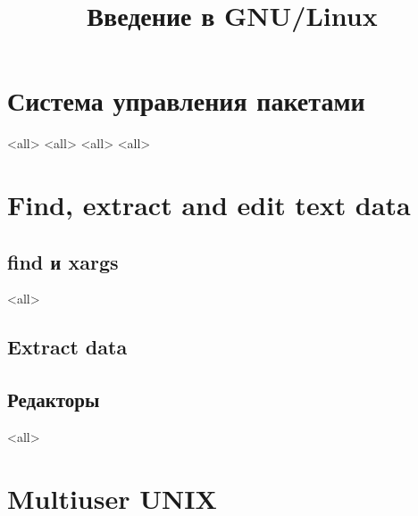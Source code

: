 

\title{Введение в GNU/Linux}








\begin{frame}
	\frametitle{}
	\titlepage
	\vspace{-0.5cm}
	\begin{center}
	\end{center}
\end{frame}




\section{Система управления пакетами}
\mode<all>{}
\mode<all>{}
\mode<all>{}
\mode<all>{}

\section{Find, extract and edit text data}

\subsection{find и xargs}
\mode<all>{}
\subsection{Extract data}
\subsection{Редакторы}
\mode<all>{}

\section{Multiuser UNIX}


